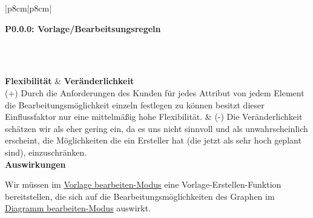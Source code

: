 \documentclass[enabledeprecatedfontcommands,fontsize=11pt,paper=a4,twoside]{scrartcl}
\newcounter{one}
\newcounter{two}[one]
\newcounter{three}[two]
\newcommand{\tone}{0\theone}
\newcommand{\ttwo}{0\thetwo}
\newcommand{\three}{\stepcounter{three}0\thethree}
\begin{document}
\begin{tabular} {|p{8cm}|p{8cm}|}
	\hline
	 {\parbox{16cm}{\textbf{\hypertarget{y}{P\tone.\ttwo.\three}: Vorlage/Bearbeitsungsregeln}} } \\  \hline\hline 
	\rule{0pt}{8ex}\\ [3ex] \hline
	\textbf{Flexibilität}  & \textbf{Veränderlichkeit} \\
	(+) Durch die Anforderungen des Kunden für jedes Attribut von jedem Element die Bearbeitungsmöglichkeit einzeln festlegen zu können besitzt dieser Einflussfaktor nur eine mittelmäßig hohe Flexibilität. &
	(-) Die Veränderlichkeit schätzen wir als eher gering ein, da es uns nicht sinnvoll und als unwahrscheinlich erscheint, die Möglichkeiten die ein Ersteller hat (die jetzt als sehr hoch geplant sind), einzuschränken.
	\\
	\hline
	 {\textbf{Auswirkungen}} \\
	 {\parbox{16cm}{Wir müssen im \hyperlink{``Vorlage bearbeiten''-Modus}{\glqq Vorlage bearbeiten\grqq-Modus} eine Vorlage-Erstellen-Funktion bereitstellen, die sich auf die Bearbeitungsmöglichkeiten des Graphen im \hyperlink{``Diagramm bearbeiten''-Modus}{\glqq Diagramm bearbeiten\grqq-Modus} auswirkt.} }\\ \hline
\end{tabular}
\newpage
\end{document}
